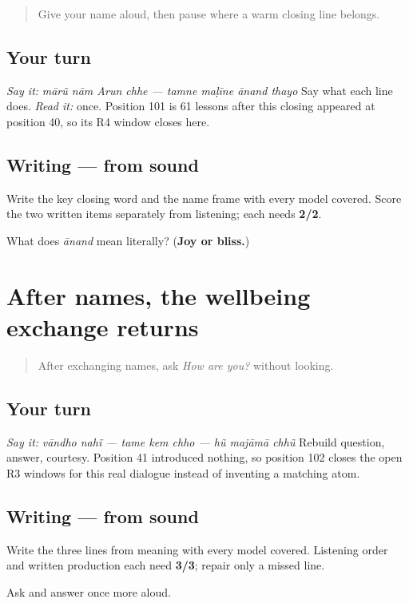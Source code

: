 \begin{quote}
Give your name aloud, then pause where a warm closing line belongs.
\end{quote}

\subsection*{Your turn}
\emph{Say it:} \emph{mārũ nām Arun chhe — tamne maḷīne ānand thayo} Say what each line does. \emph{Read it:} \textbf{   } once. Position 101 is 61 lessons after this closing appeared at position 40, so its R4 window closes here.

\subsection*{Writing — from sound}
Write the key closing word and the name frame with every model covered. Score the two written items separately from listening; each needs \textbf{2/2}.

\begin{tcolorbox}[breakable,colback=teal!4,colframe=teal!35!black,title={Before you move on}]
What does \emph{ānand} mean literally? (\textbf{Joy or bliss.})
\end{tcolorbox}
\section[Practice]{After names, the wellbeing exchange returns}

\label{lesson:GU-R16-wellbeing-r3}



\begin{quote}
After exchanging names, ask \emph{How are you?} without looking.
\end{quote}

\subsection*{Your turn}
\emph{Say it:} \emph{vāndho nahĩ — tame kem chho — hũ majāmā chhũ} Rebuild question, answer, courtesy. Position 41 introduced nothing, so position 102 closes the open R3 windows for this real dialogue instead of inventing a matching atom.

\subsection*{Writing — from sound}
Write the three lines from meaning with every model covered. Listening order and written production each need \textbf{3/3}; repair only a missed line.

\begin{tcolorbox}[breakable,colback=teal!4,colframe=teal!35!black,title={Before you move on}]
Ask and answer once more aloud.
\end{tcolorbox}
